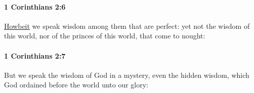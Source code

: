 		\paragraph{1 Corinthians 2:6} %
			\label{1CORINTHIANS-2-6}

			\hyperref[HOWBEIT-1828]{Howbeit} we speak wisdom among them that are perfect: yet not the wisdom of this world, nor of the princes of this world, that come to nought:

			\begin{framed}
			\scriptsize
				\begin{compactdesc}
					\item[SBLG] 
				\end{compactdesc}
			\end{framed}

		\paragraph{1 Corinthians 2:7} %
			\label{1CORINTHIANS-2-7}

			But we speak the wisdom of God in a mystery, even the hidden wisdom, which God ordained before the world unto our glory:

